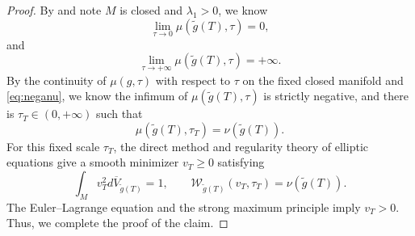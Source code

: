 \documentclass[11pt, reqno]{amsart}
\numberwithin{equation}{section}
\theoremstyle{remark}
\newcommand{\dbarV}[1]{d\overline V_{#1}}
\newcommand{\W}{\mathcal{W}}
\begin{document}
{\begin{proof}
By \cite[Section 3.1]{Perelman} and note $M$ is closed and $\lambda_1>0$, we know
\begin{equation}\label{eq:mu0}
\lim_{\tau\to0}\mu(\widetilde{g}(T), \tau)=0,
\end{equation}
and 
\begin{equation}\label{eq:muinfty}
    \lim_{\tau\to+\infty}\mu(\widetilde{g}(T), \tau)=+\infty.
\end{equation}
By the continuity of $\mu(g, \tau)$ with respect to $\tau$ on the fixed closed manifold and \eqref{eq:neganu}, we know the infimum of $\mu(\widetilde{g}(T), \tau)$ is strictly negative, and there is $\tau_T\in(0, +\infty)$ such that 
$$\mu(\widetilde{g}(T), \tau_T)=\nu(\widetilde{g}(T)).$$
For this fixed scale $\tau_T$, the direct method and regularity theory of elliptic equations give a smooth minimizer $v_T\ge 0$ satisfying 
\begin{equation}\label{W(g(T))=nug(T)}
    \int_M v_T^2\dbarV{\widetilde{g}(T)}=1,\qquad \W_{\widetilde{g}(T)}(v_T,\tau_T)=\nu(\widetilde{g}(T)).
\end{equation}
The Euler–Lagrange equation and the strong maximum principle imply $v_T>0$. Thus, we complete the proof of the claim.


\end{proof}}
\end{document}
